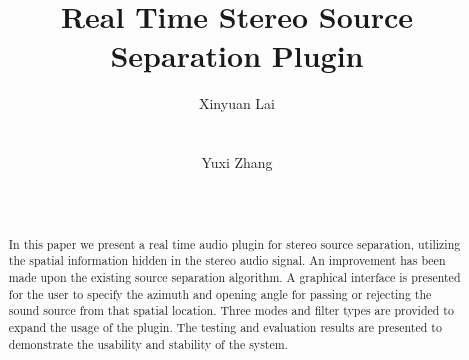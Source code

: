 \documentclass{sig-alternate}
\begin{document}
%

\title{Real Time Stereo Source Separation Plugin}


%
\author{
%
%
\alignauthor
Xinyuan Lai\\
       \\
       \\
\alignauthor
Yuxi Zhang\\
       \\
       \\
}


\maketitle

\begin{abstract}

In this paper we present a real time audio plugin for stereo source separation, utilizing the spatial information hidden in the stereo audio signal. An improvement has been made upon the existing source separation algorithm. A graphical interface is presented for the user to specify the azimuth and opening angle for passing or rejecting the sound source from that spatial location. Three modes and filter types are provided to expand the usage of the plugin.  The testing and evaluation results are presented to demonstrate the usability and stability of the system. 

\smallskip

\end{abstract}
\end{document}

